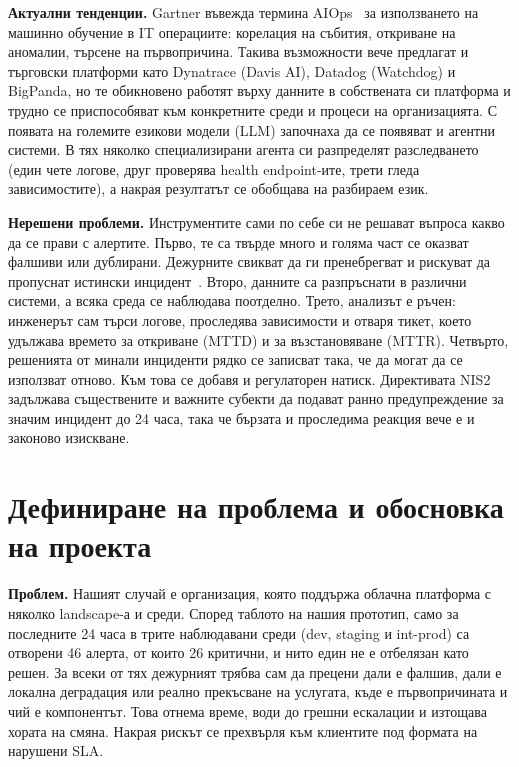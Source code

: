 \documentclass[11pt,a4paper]{article}
\begin{document}
\textbf{Актуални тенденции.} Gartner въвежда термина AIOps~\cite{aiops} за
използването на машинно обучение в IT операциите: корелация на събития,
откриване на аномалии, търсене на първопричина. Такива възможности вече
предлагат и търговски платформи като Dynatrace (Davis AI), Datadog (Watchdog)
и BigPanda, но те обикновено работят върху данните в собствената си платформа
и трудно се приспособяват към конкретните среди и процеси на организацията.
С появата на големите езикови
модели (LLM) започнаха да се появяват и агентни системи. В тях няколко
специализирани агента си разпределят разследването (един чете логове, друг
проверява health endpoint-ите, трети гледа зависимостите), а накрая
резултатът се обобщава на разбираем език.

\textbf{Нерешени проблеми.} Инструментите сами по себе си не решават въпроса
какво да се прави с алертите. Първо, те са твърде много и голяма част се
оказват фалшиви или дублирани. Дежурните свикват да ги пренебрегват и
рискуват да пропуснат истински инцидент~\cite{sre}. Второ, данните са
разпръснати в различни системи, а всяка среда се наблюдава поотделно. Трето,
анализът е ръчен: инженерът сам търси логове, проследява зависимости и отваря
тикет, което удължава времето за откриване (MTTD) и за възстановяване (MTTR).
Четвърто, решенията от минали инциденти рядко се записват така, че да могат
да се използват отново. Към това се добавя и регулаторен натиск. Директивата
NIS2~\cite{nis2} задължава съществените и важните субекти да подават
ранно предупреждение за значим инцидент до 24 часа, така че бързата и
проследима реакция вече е и законово изискване.

\section{Дефиниране на проблема и обосновка на проекта}

\textbf{Проблем.} Нашият случай е организация, която поддържа облачна
платформа с няколко landscape-а и среди. Според таблото на нашия прототип,
само за последните 24 часа в трите наблюдавани среди (dev, staging и int-prod)
са отворени 46 алерта, от които 26 критични, и нито един не е отбелязан като
решен. За всеки от тях дежурният
трябва сам да прецени дали е фалшив, дали е локална деградация или реално
прекъсване на услугата, къде е първопричината и чий е компонентът. Това
отнема време, води до грешни ескалации и изтощава хората на смяна. Накрая
рискът се прехвърля към клиентите под формата на нарушени SLA.
\end{document}
